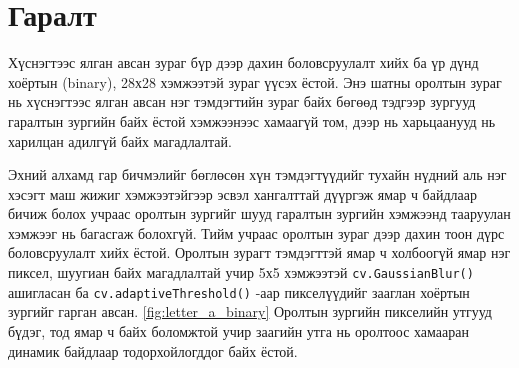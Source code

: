 \section{Гаралт}

Хүснэгтээс ялган авсан зураг бүр дээр дахин боловсруулалт хийх ба үр дүнд хоёртын (binary), 28х28 хэмжээтэй зураг үүсэх ёстой. Энэ шатны оролтын зураг нь хүснэгтээс ялган авсан нэг тэмдэгтийн зураг байх бөгөөд тэдгээр зургууд гаралтын зургийн байх ёстой хэмжээнээс хамаагүй том, дээр нь харьцаанууд нь харилцан адилгүй байх магадлалтай.

Эхний алхамд гар бичмэлийг бөглөсөн хүн тэмдэгтүүдийг тухайн нүдний аль нэг хэсэгт маш жижиг хэмжээтэйгээр эсвэл хангалттай дүүргэж ямар ч байдлаар бичиж болох учраас оролтын зургийг шууд гаралтын зургийн хэмжээнд тааруулан хэмжээг нь багасгаж болохгүй. Тийм учраас оролтын зураг дээр дахин тоон дүрс боловсруулалт хийх ёстой. Оролтын зурагт тэмдэгттэй ямар ч холбоогүй ямар нэг пиксел, шуугиан байх магадлалтай учир 5х5 хэмжээтэй \texttt{cv.GaussianBlur()} ашигласан ба \texttt{cv.adaptiveThreshold()} -аар пикселүүдийг зааглан хоёртын зургийг гарган авсан. \ref{fig:letter_a_binary} Оролтын зургийн пикселийн утгууд бүдэг, тод ямар ч байх боломжтой учир заагийн утга нь оролтоос хамааран динамик байдлаар тодорхойлогддог байх ёстой.


